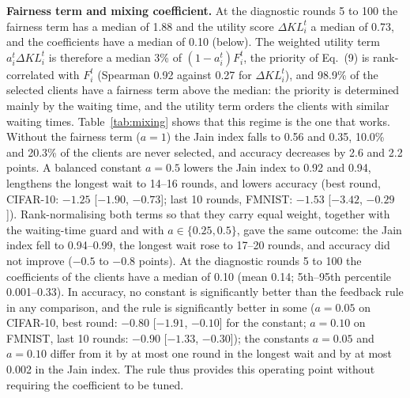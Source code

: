 \documentclass[pdflatex,sn-mathphys-num,oneside]{sn-jnl}%
\theoremstyle{thmstyleone}%
\theoremstyle{thmstyletwo}%
\theoremstyle{thmstylethree}%
\begin{document}
\textbf{Fairness term and mixing coefficient.} At the diagnostic rounds 5 to 100 the fairness term has a median of 1.88 and the utility score $\Delta KL_i^t$ a median of 0.73, and the coefficients have a median of 0.10 (below). The weighted utility term $a_i^t\Delta KL_i^t$ is therefore a median 3\% of $(1-a_i^t)F_i^t$, the priority of Eq.~(9) is rank-correlated with $F_i^t$ (Spearman 0.92 against 0.27 for $\Delta KL_i^t$), and 98.9\% of the selected clients have a fairness term above the median: the priority is determined mainly by the waiting time, and the utility term orders the clients with similar waiting times. Table~\ref{tab:mixing} shows that this regime is the one that works. Without the fairness term ($a=1$) the Jain index falls to 0.56 and 0.35, 10.0\% and 20.3\% of the clients are never selected, and accuracy decreases by 2.6 and 2.2 points. A balanced constant $a=0.5$ lowers the Jain index to 0.92 and 0.94, lengthens the longest wait to 14--16 rounds, and lowers accuracy (best round, CIFAR-10: $-1.25$ [$-1.90$, $-0.73$]; last 10 rounds, FMNIST: $-1.53$ [$-3.42$, $-0.29$]). Rank-normalising both terms so that they carry equal weight, together with the waiting-time guard and with $a\in\{0.25,0.5\}$, gave the same outcome: the Jain index fell to 0.94--0.99, the longest wait rose to 17--20 rounds, and accuracy did not improve ($-0.5$ to $-0.8$ points). At the diagnostic rounds 5 to 100 the coefficients of the clients have a median of 0.10 (mean 0.14; 5th--95th percentile 0.001--0.33). In accuracy, no constant is significantly better than the feedback rule in any comparison, and the rule is significantly better in some ($a=0.05$ on CIFAR-10, best round: $-0.80$ [$-1.91$, $-0.10$] for the constant; $a=0.10$ on FMNIST, last 10 rounds: $-0.90$ [$-1.33$, $-0.30$]); the constants $a=0.05$ and $a=0.10$ differ from it by at most one round in the longest wait and by at most 0.002 in the Jain index. The rule thus provides this operating point without requiring the coefficient to be tuned.
\end{document}
